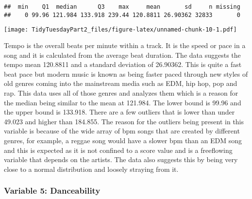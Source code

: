 \documentclass[
]{article}
\newenvironment{Shaded}{\begin{snugshade}}{\end{snugshade}}
\newcommand{\KeywordTok}[1]{\textcolor[rgb]{0.13,0.29,0.53}{\textbf{#1}}}
\newcommand{\NormalTok}[1]{#1}
\newcommand{\OperatorTok}[1]{\textcolor[rgb]{0.81,0.36,0.00}{\textbf{#1}}}
\newcommand{\StringTok}[1]{\textcolor[rgb]{0.31,0.60,0.02}{#1}}
\begin{document}
\begin{Shaded}
\end{Shaded}

\begin{verbatim}
##  min    Q1  median      Q3    max     mean       sd     n missing
##    0 99.96 121.984 133.918 239.44 120.8811 26.90362 32833       0
\end{verbatim}

\texttt{[image: TidyTuesdayPart2\_files/figure-latex/unnamed-chunk-10-1.pdf]}

Tempo is the overall beats per minute within a track. It is the speed or
pace in a song and it is calculated from the average beat duration. The
data suggests the tempo mean 120.8811 and a standard deviation of
26.90362. This is quite a fast beat pace but modern music is known as
being faster paced through new styles of old genres coming into the
mainstream media such as EDM, hip hop, pop and rap. This data uses all
of those genres and analyzes them which is a reason for the median being
similar to the mean at 121.984. The lower bound is 99.96 and the upper
bound is 133.918. There are a few outliers that is lower than under
49.023 and higher than 184.855. The reason for the outliers being
present in this variable is because of the wide array of bpm songs that
are created by different genres, for example, a reggae song would have a
slower bpm than an EDM song and this is expected as it is not confined
to a score value and is a freeflowing variable that depends on the
artists. The data also suggests this by being very close to a normal
distribution and loosely straying from it.

\hypertarget{variable-5-danceability}{%
\subsubsection{Variable 5: Danceability}\label{variable-5-danceability}}

\begin{Shaded}
\end{Shaded}
\end{document}
